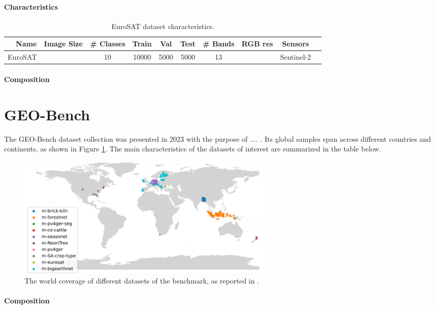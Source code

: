 \documentclass[a4paper, oneside, english]{sapthesis}
\begin{document}
\paragraph{Characteristics}


\begin{table}[ht]
\centering
\footnotesize
\renewcommand{\arraystretch}{1.2}
    \begin{tabular}{rcccccclcl}
    \toprule
    Name & Image Size & \# Classes & Train & Val & Test & \# Bands & RGB res & Sensors  \\
    \midrule
    EuroSAT & & 10 & 10000 & 5000 & 5000 & 13 & & Sentinel-2 \\
    \bottomrule
    \end{tabular}
\vspace{0.3cm}
\caption{\normalsize EuroSAT dataset characteristics.}
\label{tab:classtypes}
\end{table}


\paragraph{Composition}

\section{GEO-Bench}

The GEO-Bench dataset collection \cite{lacoste2023geo} was presented in 2023 with the purpose of .... . Its global samples span across different countries and continents, as shown in Figure \ref{fig:geoworld}. The main characteristics of the datasets of interest are summarized in the table below. 

\begin{figure}[h]
    \centering
    \includegraphics[width=0.6\textwidth]{img/geobench_world_coverage.png}
    \caption{The world coverage of different datasets of the benchmark, as reported in \cite{lacoste2023geo}.}
    \label{fig:geoworld}
\end{figure}

\paragraph{Composition}
\end{document}

